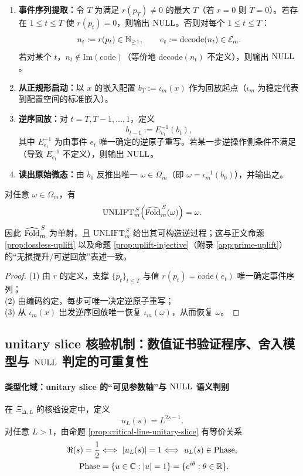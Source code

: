 \begin{enumerate}
  \item \textbf{事件序列提取：}令 $T$ 为满足 $r(p_T)\neq 0$ 的最大 $T$（若 $r=0$ 则 $T=0$）。若存在 $1\le t\le T$ 使 $r(p_t)=0$，则输出 $\mathrm{NULL}$。否则对每个 $1\le t\le T$：
  $$
  n_t:=r(p_t)\in\mathbb{N}_{\ge 1},\qquad e_t:=\mathrm{decode}(n_t)\in\mathcal E_m.
  $$
  若对某个 $t$，$n_t\notin\mathrm{Im}(\mathrm{code})$（等价地 $\mathrm{decode}(n_t)$ 不定义），则输出 $\mathrm{NULL}$。

  \item \textbf{从正规形启动：}以 $x$ 的嵌入配置 $b_T:=\iota_m(x)$ 作为回放起点（$\iota_m$ 为稳定代表到配置空间的标准嵌入）。

  \item \textbf{逆序回放：}对 $t=T,T-1,\dots,1$，定义
  $$
  b_{t-1}:=E_{e_t}^{-1}(b_t),
  $$
  其中 $E_{e_t}^{-1}$ 为由事件 $e_t$ 唯一确定的逆原子重写。若某一步逆操作侧条件不满足（导致 $E_{e_t}^{-1}$ 不定义），则输出 $\mathrm{NULL}$。

  \item \textbf{读出原始微态：}由 $b_0$ 反推出唯一 $\omega\in\Omega_m$（即 $\omega=\iota_m^{-1}(b_0)$），并输出之。
\end{enumerate}

\begin{proposition}[回放正确性与可判定互逆]\label{prop:unlift-correctness}
对任意 $\omega\in\Omega_m$，有
$$
\mathrm{UNLIFT}_m^{\,S}\!\left(\widehat{\mathrm{Fold}}_m^{\,S}(\omega)\right)=\omega.
$$
因此 $\widehat{\mathrm{Fold}}_m^{\,S}$ 为单射，且 $\mathrm{UNLIFT}_m^{\,S}$ 给出其可构造逆过程；这与正文命题 \ref{prop:lossless-uplift} 以及命题 \ref{prop:uplift-injective}（附录 \ref{app:prime-uplift}）的“无损提升/可逆回放”表述一致。
\end{proposition}

\begin{proof}
(1) 由 $r$ 的定义，支撑 $\{p_t\}_{t\le T}$ 与值 $r(p_t)=\mathrm{code}(e_t)$ 唯一确定事件序列；\\
(2) 由编码约定，每步可唯一决定逆原子重写；\\
(3) 从 $\iota_m(x)$ 出发逆序回放唯一恢复 $\iota_m(\omega)$，从而恢复 $\omega$。
\end{proof}

\subsection{unitary slice 核验机制：数值证书验证程序、舍入模型与 \texorpdfstring{$\mathrm{NULL}$}{NULL} 判定的可重复性}

\paragraph{类型化域：unitary slice 的“可见参数轴”与 \texorpdfstring{$\mathrm{NULL}$}{NULL} 语义判别}
在 $\Xi_{\Delta,L}$ 的核验设定中，定义
$$
u_L(s)=L^{2s-1}.
$$
对任意 $L>1$，由命题 \ref{prop:critical-line-unitary-slice} 有等价关系
$$
\begin{aligned}
\Re(s)=\frac12
&\Longleftrightarrow\ \left\lvert u_L(s)\right\rvert=1
\Longleftrightarrow\ u_L(s)\in \mathrm{Phase},\\
\mathrm{Phase}
&=\{u\in\mathbb{C}:\left\lvert u\right\rvert=1\}
=\{e^{i\theta}:\theta\in\mathbb{R}\}.
\end{aligned}
$$

